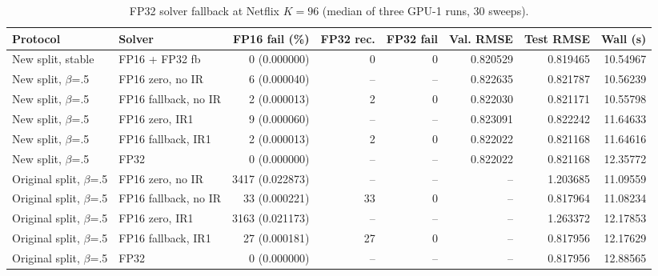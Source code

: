 \begin{table}[t]
\centering
\caption{FP32 solver fallback at Netflix $K=96$ (median of three GPU-1 runs, 30 sweeps).}
\label{tab:fp32-fallback}
\begin{tabular}{llrrrrrr}
\toprule
Protocol & Solver & FP16 fail (\%) & FP32 rec. & FP32 fail & Val. RMSE & Test RMSE & Wall (s) \\
\midrule
New split, stable & FP16 + FP32 fb & 0 (0.000000) & 0 & 0 & 0.820529 & 0.819465 & 10.54967 \\
New split, $\beta$=.5 & FP16 zero, no IR & 6 (0.000040) & -- & -- & 0.822635 & 0.821787 & 10.56239 \\
New split, $\beta$=.5 & FP16 fallback, no IR & 2 (0.000013) & 2 & 0 & 0.822030 & 0.821171 & 10.55798 \\
New split, $\beta$=.5 & FP16 zero, IR1 & 9 (0.000060) & -- & -- & 0.823091 & 0.822242 & 11.64633 \\
New split, $\beta$=.5 & FP16 fallback, IR1 & 2 (0.000013) & 2 & 0 & 0.822022 & 0.821168 & 11.64616 \\
New split, $\beta$=.5 & FP32 & 0 (0.000000) & -- & -- & 0.822022 & 0.821168 & 12.35772 \\
Original split, $\beta$=.5 & FP16 zero, no IR & 3417 (0.022873) & -- & -- & -- & 1.203685 & 11.09559 \\
Original split, $\beta$=.5 & FP16 fallback, no IR & 33 (0.000221) & 33 & 0 & -- & 0.817964 & 11.08234 \\
Original split, $\beta$=.5 & FP16 zero, IR1 & 3163 (0.021173) & -- & -- & -- & 1.263372 & 12.17853 \\
Original split, $\beta$=.5 & FP16 fallback, IR1 & 27 (0.000181) & 27 & 0 & -- & 0.817956 & 12.17629 \\
Original split, $\beta$=.5 & FP32 & 0 (0.000000) & -- & -- & -- & 0.817956 & 12.88565 \\
\bottomrule
\end{tabular}
\end{table}
